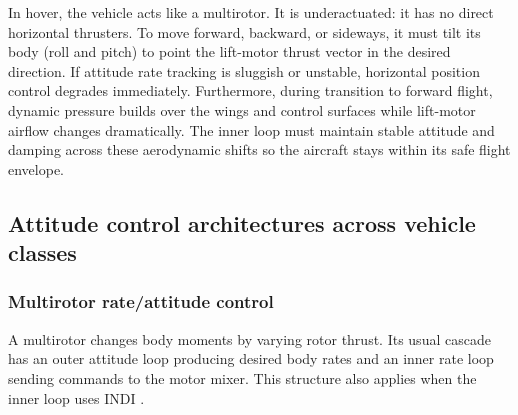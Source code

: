 \documentclass{article}
\begin{document}

In hover, the vehicle acts like a multirotor. It is underactuated: it has no direct horizontal thrusters. To move forward, backward, or sideways, it must tilt its body (roll and pitch) to point the lift-motor thrust vector in the desired direction. If attitude rate tracking is sluggish or unstable, horizontal position control degrades immediately. Furthermore, during transition to forward flight, dynamic pressure builds over the wings and control surfaces while lift-motor airflow changes dramatically. The inner loop must maintain stable attitude and damping across these aerodynamic shifts so the aircraft stays within its safe flight envelope.

\subsection{Attitude control architectures across vehicle classes}
\label{sec:architectures}

\subsubsection{Multirotor rate/attitude control}
A multirotor changes body moments by varying rotor thrust. Its usual cascade has an outer attitude loop producing desired body rates and an inner rate loop sending commands to the motor mixer. This structure also applies when the inner loop uses INDI \citep{lombaerts2019}.
\end{document}
